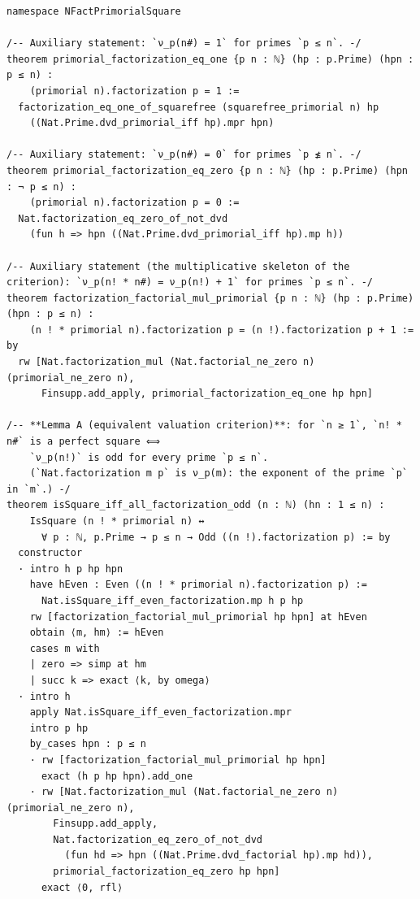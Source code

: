 \documentclass[11pt]{article}
\theoremstyle{definition}
\begin{document}
\begin{lstlisting}[basicstyle=\ttfamily\footnotesize,caption={Excerpt of the
proof file (lines 771--1094): the main namespace \texttt{NFactPrimorialSquare}
in full --- the three auxiliary factorization lemmas, Lemma~\ref{lem:A}, the
witness layer, the sixteen non-square witnesses, Lemma~\ref{lem:B} assembled
from the chain and the tail, and the two main theorems.},label={lst:main}]
namespace NFactPrimorialSquare

/-- Auxiliary statement: `ν_p(n#) = 1` for primes `p ≤ n`. -/
theorem primorial_factorization_eq_one {p n : ℕ} (hp : p.Prime) (hpn : p ≤ n) :
    (primorial n).factorization p = 1 :=
  factorization_eq_one_of_squarefree (squarefree_primorial n) hp
    ((Nat.Prime.dvd_primorial_iff hp).mpr hpn)

/-- Auxiliary statement: `ν_p(n#) = 0` for primes `p ≰ n`. -/
theorem primorial_factorization_eq_zero {p n : ℕ} (hp : p.Prime) (hpn : ¬ p ≤ n) :
    (primorial n).factorization p = 0 :=
  Nat.factorization_eq_zero_of_not_dvd
    (fun h => hpn ((Nat.Prime.dvd_primorial_iff hp).mp h))

/-- Auxiliary statement (the multiplicative skeleton of the criterion): `ν_p(n! * n#) = ν_p(n!) + 1` for primes `p ≤ n`. -/
theorem factorization_factorial_mul_primorial {p n : ℕ} (hp : p.Prime) (hpn : p ≤ n) :
    (n ! * primorial n).factorization p = (n !).factorization p + 1 := by
  rw [Nat.factorization_mul (Nat.factorial_ne_zero n) (primorial_ne_zero n),
      Finsupp.add_apply, primorial_factorization_eq_one hp hpn]

/-- **Lemma A (equivalent valuation criterion)**: for `n ≥ 1`, `n! * n#` is a perfect square ⟺
    `ν_p(n!)` is odd for every prime `p ≤ n`.
    (`Nat.factorization m p` is ν_p(m): the exponent of the prime `p` in `m`.) -/
theorem isSquare_iff_all_factorization_odd (n : ℕ) (hn : 1 ≤ n) :
    IsSquare (n ! * primorial n) ↔
      ∀ p : ℕ, p.Prime → p ≤ n → Odd ((n !).factorization p) := by
  constructor
  · intro h p hp hpn
    have hEven : Even ((n ! * primorial n).factorization p) :=
      Nat.isSquare_iff_even_factorization.mp h p hp
    rw [factorization_factorial_mul_primorial hp hpn] at hEven
    obtain ⟨m, hm⟩ := hEven
    cases m with
    | zero => simp at hm
    | succ k => exact ⟨k, by omega⟩
  · intro h
    apply Nat.isSquare_iff_even_factorization.mpr
    intro p hp
    by_cases hpn : p ≤ n
    · rw [factorization_factorial_mul_primorial hp hpn]
      exact (h p hp hpn).add_one
    · rw [Nat.factorization_mul (Nat.factorial_ne_zero n) (primorial_ne_zero n),
        Finsupp.add_apply,
        Nat.factorization_eq_zero_of_not_dvd
          (fun hd => hpn ((Nat.Prime.dvd_factorial hp).mp hd)),
        primorial_factorization_eq_zero hp hpn]
      exact ⟨0, rfl⟩


\end{lstlisting}
\end{document}
